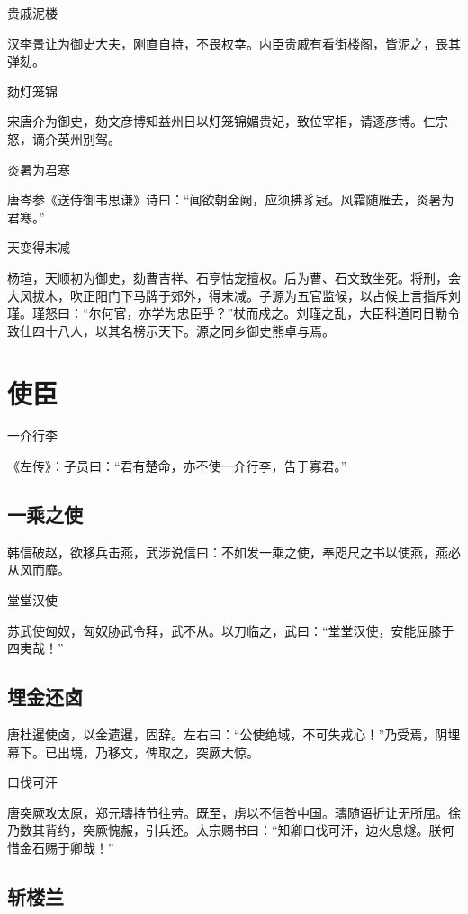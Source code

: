 \documentclass[a4paper,12pt,UTF8,twoside]{ctexbook}
\begin{document}
    贵戚泥楼
    
    汉李景让为御史大夫，刚直自持，不畏权幸。内臣贵戚有看街楼阁，皆泥之，畏其弹劾。
    
    劾灯笼锦
    
    宋唐介为御史，劾文彦博知益州日以灯笼锦媚贵妃，致位宰相，请逐彦博。仁宗怒，谪介英州别驾。
    
    炎暑为君寒
    
    唐岑参《送侍御韦思谦》诗曰：“闻欲朝金阙，应须拂豸冠。风霜随雁去，炎暑为君寒。”
    
    天变得末减
    
    杨瑄，天顺初为御史，劾曹吉祥、石亨怙宠擅权。后为曹、石文致坐死。将刑，会大风拔木，吹正阳门下马牌于郊外，得末减。子源为五官监候，以占候上言指斥刘瑾。瑾怒曰：“尔何官，亦学为忠臣乎？”杖而戍之。刘瑾之乱，大臣科道同日勒令致仕四十八人，以其名榜示天下。源之同乡御史熊卓与焉。
    
    \chapter{使臣}
    
    一介行李
    
    《左传》：子员曰：“君有楚命，亦不使一介行李，告于寡君。”
    
    \section{一乘之使}
    
    韩信破赵，欲移兵击燕，武涉说信曰：不如发一乘之使，奉咫尺之书以使燕，燕必从风而靡。
    
    堂堂汉使
    
    苏武使匈奴，匈奴胁武令拜，武不从。以刀临之，武曰：“堂堂汉使，安能屈膝于四夷哉！”
    
    \section{埋金还卤}
    
    唐杜暹使卤，以金遗暹，固辞。左右曰：“公使绝域，不可失戎心！”乃受焉，阴埋幕下。已出境，乃移文，俾取之，突厥大惊。
    
    口伐可汗
    
    唐突厥攻太原，郑元璹持节往劳。既至，虏以不信咎中国。璹随语折让无所屈。徐乃数其背约，突厥愧赧，引兵还。太宗赐书曰：“知卿口伐可汗，边火息燧。朕何惜金石赐于卿哉！”
    
    \section{斩楼兰}
    
\end{document}
